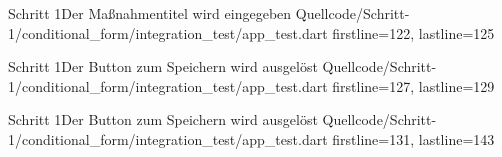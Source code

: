 \begin{alexlistingzwei}{Schritt 1}{Der Maßnahmentitel wird eingegeben}
  {Quellcode/Schritt-1/conditional_form/integration_test/app_test.dart}
  {firstline=122, lastline=125}
  \label{lst:Schritt1MaßnahmentitelWirdEingegeben}
\end{alexlistingzwei}



\begin{alexlistingzwei}{Schritt 1}{Der Button zum Speichern wird ausgelöst}
  {Quellcode/Schritt-1/conditional_form/integration_test/app_test.dart}
  {firstline=127, lastline=129}
  \label{lst:Schritt1ButtonZumSpeichernWirdAusgelöst}
\end{alexlistingzwei}

\begin{alexlistingzwei}{Schritt 1}{Der Button zum Speichern wird ausgelöst}
  {Quellcode/Schritt-1/conditional_form/integration_test/app_test.dart}
  {firstline=131, lastline=143}
  \label{lst:Schritt1ErgebnisWirdVerglichen}
\end{alexlistingzwei}


